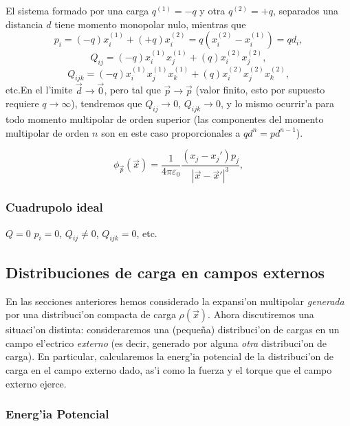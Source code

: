 El sistema formado por una carga $q^{(1)}=-q$ y otra $q^{(2)}=+q$, separados una distancia $d$ tiene momento monopolar nulo, mientras que 
\begin{equation}
p_i=(-q)x^{(1)}_i+(+q)x^{(2)}_i=q(x^{(2)}_i-x^{(1)}_i)=qd_i,
\end{equation}
\begin{equation}
Q_{ij}=(-q)x^{(1)}_i x^{(1)}_j +(q)x^{(2)}_i x^{(2)}_j,
\end{equation}
\begin{equation}
Q_{ijk}=(-q)x^{(1)}_i x^{(1)}_jx^{(1)}_k +(q)x^{(2)}_i x^{(2)}_jx^{(2)}_k,
\end{equation}
etc.En el l'imite $\vec{d}\to\vec{0}$, pero tal que $\vec{p}\to\vec{p}$ (valor finito, esto por supuesto requiere $q\to\infty$), tendremos que $Q_{ij}\to 0$, $Q_{ijk}\to 0$, y lo mismo ocurrir'a para todo momento multipolar de orden superior  (las componentes del momento multipolar de orden $n$ son en este caso proporcionales a $qd^n=pd^{n-1}$).

\begin{equation}\label{phip}
\phi_{\vec{p}}(\vec{x})=\frac{1}{4\pi\varepsilon_0}\frac{(x_j-x_j')p_j}
{|\vec{x}-\vec{x}'|^3},
\end{equation}
\subsubsection{Cuadrupolo ideal}
$Q=0$ $p_i=0$, $Q_{ij}\neq 0$, $Q_{ijk}=0$, etc.

\newpage


\subsection{Distribuciones de carga en campos externos} \label{ed3_3}

En las secciones anteriores hemos considerado la expansi'on multipolar
\textit{generada} por una distribuci'on compacta de carga
$\rho(\vec{x})$. Ahora discutiremos una situaci'on distinta: consideraremos
una (peque\~na) distribuci'on de cargas en un campo el'ectrico
\textit{externo} (es decir, generado por alguna \textit{otra} distribuci'on de
carga). En particular, calcularemos la energ'ia potencial de la
distribuci'on de carga en el campo externo dado, as'i como la fuerza y el
torque que el campo externo ejerce.

\subsubsection{Energ'ia Potencial} \label{ed3_3_1}


